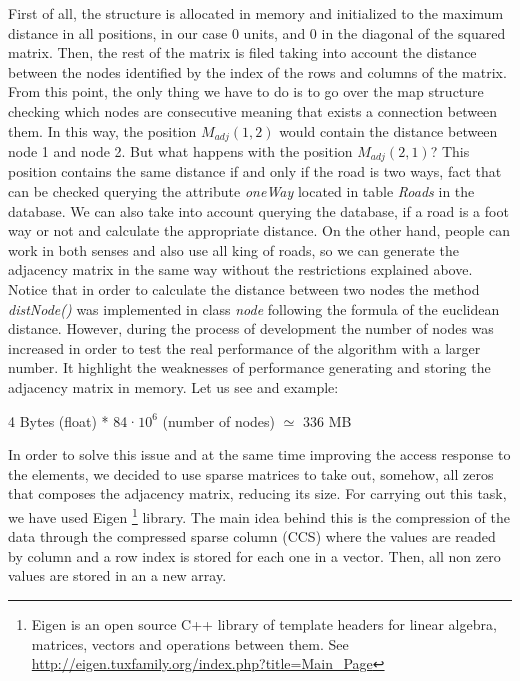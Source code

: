 \documentclass{article}
\begin{document}
First of all, the structure is allocated in memory and initialized to the maximum distance in all positions, in our case 0 units, and 0 in the diagonal of the squared matrix. Then, the rest of the matrix is filed taking into account the distance between the nodes identified by the index of the rows and columns of the matrix. From this point, the only thing we have to do is to go over the map structure checking which nodes are consecutive meaning that exists a connection between them. In this way, the position $M_{adj}(1,2)$ would contain the distance between node 1 and node 2. But what happens with the position $M_{adj}(2,1)$? This position contains the same distance if and only if the road is two ways, fact that can be checked querying the attribute \textit{oneWay} located in table \textit{Roads} in the database. 
We can also take into account querying the database, if a road is a foot way or not and calculate the appropriate distance.
On the other hand, people can work in both senses and also use all king of roads, so we can generate the adjacency matrix in the same way without the restrictions explained above. Notice that in order to calculate the distance between two nodes the method \textit{distNode()} was implemented in class \textit{node } following the formula of the euclidean distance. 
However, during the process of development the number of nodes was increased in order to test the real performance of the algorithm with a larger number. It highlight the weaknesses of performance generating and storing the adjacency matrix in memory. Let us see and example:

\begin{center}
4 Bytes (float) * 84·$10^{6}$ (number of nodes) $\simeq$ 336 MB
\end{center}

In order to solve this issue and at the same time improving the access response to the elements, we decided to use sparse matrices to take out, somehow, all zeros that composes the adjacency matrix, reducing its size. For carrying out this task, we have used Eigen \footnote{Eigen is an open source C++ library of template headers for linear algebra, matrices, vectors and operations between them. See \url{ http://eigen.tuxfamily.org/index.php?title=Main_Page}} library. The main idea behind this is the compression of the data through the compressed sparse column (CCS) where the values are readed by column and a row index is stored for each one in a vector. Then, all non zero values are stored in an a new array. 
\end{document}
